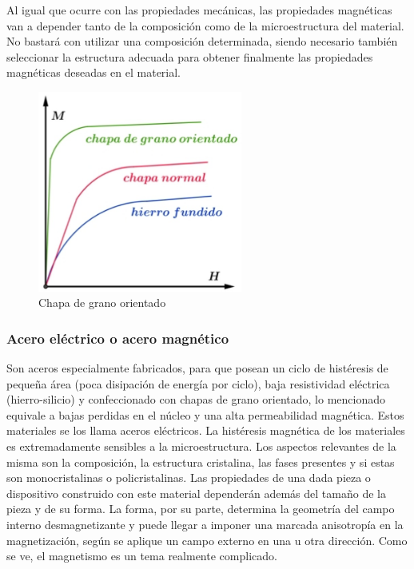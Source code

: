 Al igual que ocurre con las propiedades mecánicas, las propiedades magnéticas van a depender tanto de la composición como de la microestructura del material. No bastará con utilizar una composición determinada, siendo necesario también seleccionar la estructura adecuada para obtener finalmente las propiedades magnéticas deseadas en el material.


\begin{figure}[H]
    \centering
    \includegraphics[width=0.6\textwidth]{./Figures/granoOrientado}
	\caption{Chapa de grano orientado}
	\label{fig:granoOrientado}
\end{figure}


\subsubsection{Acero eléctrico o acero magnético}

Son aceros especialmente fabricados, para que posean un ciclo de histéresis de pequeña área (poca disipación de energía por ciclo), baja resistividad eléctrica (hierro-silicio) y confeccionado con chapas de grano orientado, lo mencionado equivale a bajas perdidas en el núcleo y una alta permeabilidad magnética. Estos materiales se los llama aceros eléctricos. La histéresis magnética de los materiales es extremadamente sensibles a la microestructura. Los aspectos relevantes de la misma son la composición, la estructura cristalina, las fases presentes y si estas son monocristalinas o policristalinas. Las propiedades de una dada pieza o dispositivo construido con este material dependerán además del tamaño de la pieza y de su forma. La forma, por su parte, determina la geometría del campo interno desmagnetizante y puede llegar a imponer una marcada anisotropía en la magnetización, según se aplique un campo externo en una u otra dirección. Como se ve, el magnetismo es un tema realmente complicado.


